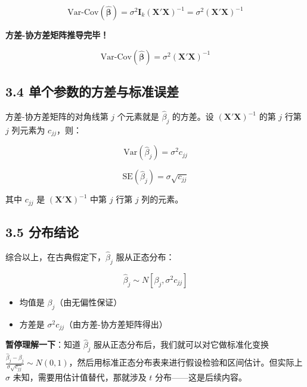 \documentclass[12pt,a4paper]{ctexart}
\begin{document}
\begin{equation}
\text{Var-Cov}(\hat{\boldsymbol{\beta}}) = \sigma^2 \mathbf{I}_k (\mathbf{X}'\mathbf{X})^{-1} = \sigma^2 (\mathbf{X}'\mathbf{X})^{-1} \tag{3.31}
\end{equation}

\textbf{方差-协方差矩阵推导完毕！}

\[
\text{Var-Cov}(\hat{\boldsymbol{\beta}}) = \sigma^2 (\mathbf{X}'\mathbf{X})^{-1}
\]

\subsection{3.4 单个参数的方差与标准误差}

方差-协方差矩阵的对角线第 $j$ 个元素就是 $\hat{\beta}_j$ 的方差。设 $(\mathbf{X}'\mathbf{X})^{-1}$ 的第 $j$ 行第 $j$ 列元素为 $c_{jj}$，则：

\begin{equation}
\text{Var}(\hat{\beta}_j) = \sigma^2 c_{jj} \tag{3.32}
\end{equation}

\begin{equation}
\text{SE}(\hat{\beta}_j) = \sigma\sqrt{c_{jj}} \tag{3.33}
\end{equation}

其中 $c_{jj}$ 是 $(\mathbf{X}'\mathbf{X})^{-1}$ 中第 $j$ 行第 $j$ 列的元素。

\subsection{3.5 分布结论}

综合以上，在古典假定下，$\hat{\beta}_j$ 服从正态分布：

\begin{equation}
\hat{\beta}_j \sim N[\beta_j, \sigma^2 c_{jj}] \tag{3.34}
\end{equation}

\begin{itemize}
    \item 均值是 $\beta_j$（由无偏性保证）
    \item 方差是 $\sigma^2 c_{jj}$（由方差-协方差矩阵得出）
\end{itemize}

\textbf{暂停理解一下}：知道 $\hat{\beta}_j$ 服从正态分布后，我们就可以对它做标准化变换 $\frac{\hat{\beta}_j - \beta_j}{\sigma\sqrt{c_{jj}}} \sim N(0,1)$，然后用标准正态分布表来进行假设检验和区间估计。但实际上 $\sigma$ 未知，需要用估计值替代，那就涉及 $t$ 分布——这是后续内容。
\end{document}
